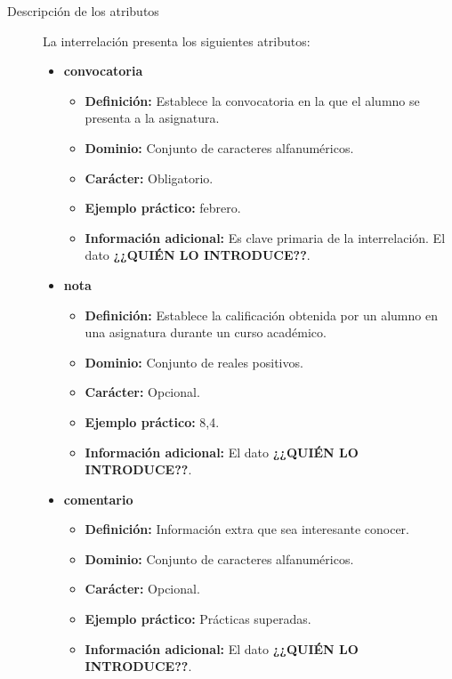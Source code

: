 \begin{description}
      \item[Descripción de los atributos] La interrelación presenta los
      siguientes atributos:

       \begin{itemize}
        \item \textbf{convocatoria}
          \begin{itemize}
            \item \textbf{Definición:} Establece la convocatoria en la que el
            alumno se presenta a la asignatura.
            \item \textbf{Dominio:} Conjunto de caracteres alfanuméricos.
            \item \textbf{Carácter:} Obligatorio.
            \item \textbf{Ejemplo práctico:} febrero.
            \item \textbf{Información adicional:} Es clave primaria de la
            interrelación. El dato \textbf{¿¿QUIÉN LO INTRODUCE??}.
         \end{itemize}
         \item \textbf{nota}
          \begin{itemize}
            \item \textbf{Definición:} Establece la calificación obtenida por un
            alumno en una asignatura durante un curso académico.
            \item \textbf{Dominio:} Conjunto de reales positivos.
            \item \textbf{Carácter:} Opcional.
            \item \textbf{Ejemplo práctico:} 8,4.
            \item \textbf{Información adicional:} El dato \textbf{¿¿QUIÉN LO INTRODUCE??}.
         \end{itemize}
          \item \textbf{comentario}
          \begin{itemize}
            \item \textbf{Definición:} Información extra que sea interesante
            conocer.
            \item \textbf{Dominio:} Conjunto de caracteres alfanuméricos.
            \item \textbf{Carácter:} Opcional.
            \item \textbf{Ejemplo práctico:} Prácticas superadas.
            \item \textbf{Información adicional:} El dato \textbf{¿¿QUIÉN LO INTRODUCE??}.
         \end{itemize}
       \end{itemize}


\end{description}
